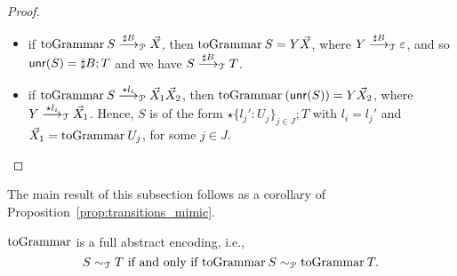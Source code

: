 \begin{proof}
	\begin{itemize}
		\item if $\toGrammarf{S}\LTSderivesP[\sharp B] \vec X$, then
		$\toGrammarf{S} = Y \vec X$, where $Y\LTSderives[\sharp B] \varepsilon$,
		and so $\Unravel(S) = \sharp B; T$ and we have $S\LTSderives[\sharp B] T$.
		\item if $\toGrammarf{S} \LTSderivesP[\star l_i] \vec X_1 \vec X_2$, then
		$\toGrammarf{(\Unravel(S))} = Y \vec X_2$, where $Y\LTSderives[\star l_i] \vec X_1$.
		Hence, $S$ is of the form $\star\{l_j' :U_j\}_{j\in J};T$ with $l_i = l_j'$ and
		$\vec X_1 = \toGrammarf{U_j}$, for some $j\in J$.
	\end{itemize}
\end{proof}


The main result of this subsection follows as a corollary
of Proposition~\ref{prop:transitions_mimic}.

\begin{theorem}
	$\toGrammark$ is a full abstract encoding, i.e.,
	$$S \TypeEquiv T \text{ if and only if } 
	\toGrammarf{S} \ProdEquiv \toGrammarf{T}.$$
\end{theorem}



